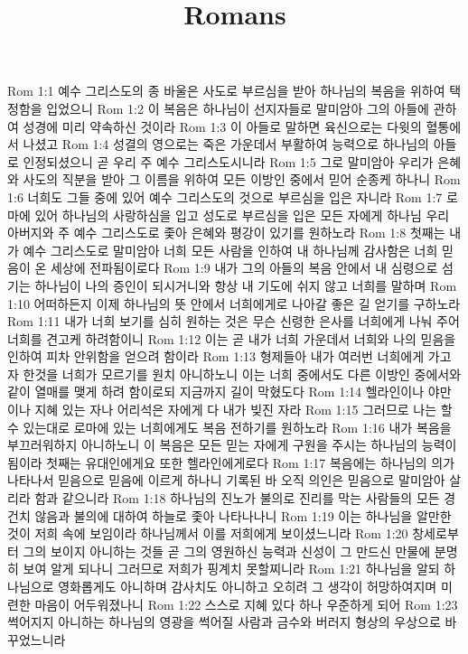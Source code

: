 

\title{Romans}

Rom 1:1  예수 그리스도의 종 바울은 사도로 부르심을 받아 하나님의 복음을 위하여 택정함을 입었으니
Rom 1:2  이 복음은 하나님이 선지자들로 말미암아 그의 아들에 관하여 성경에 미리 약속하신 것이라
Rom 1:3  이 아들로 말하면 육신으로는 다윗의 혈통에서 나셨고
Rom 1:4  성결의 영으로는 죽은 가운데서 부활하여 능력으로 하나님의 아들로 인정되셨으니 곧 우리 주 예수 그리스도시니라
Rom 1:5  그로 말미암아 우리가 은혜와 사도의 직분을 받아 그 이름을 위하여 모든 이방인 중에서 믿어 순종케 하나니
Rom 1:6  너희도 그들 중에 있어 예수 그리스도의 것으로 부르심을 입은 자니라
Rom 1:7  로마에 있어 하나님의 사랑하심을 입고 성도로 부르심을 입은 모든 자에게 하나님 우리 아버지와 주 예수 그리스도로 좇아 은혜와 평강이 있기를 원하노라
Rom 1:8  첫째는 내가 예수 그리스도로 말미암아 너희 모든 사람을 인하여 내 하나님께 감사함은 너희 믿음이 온 세상에 전파됨이로다
Rom 1:9  내가 그의 아들의 복음 안에서 내 심령으로 섬기는 하나님이 나의 증인이 되시거니와 항상 내 기도에 쉬지 않고 너희를 말하며
Rom 1:10  어떠하든지 이제 하나님의 뜻 안에서 너희에게로 나아갈 좋은 길 얻기를 구하노라
Rom 1:11  내가 너희 보기를 심히 원하는 것은 무슨 신령한 은사를 너희에게 나눠 주어 너희를 견고케 하려함이니
Rom 1:12  이는 곧 내가 너희 가운데서 너희와 나의 믿음을 인하여 피차 안위함을 얻으려 함이라
Rom 1:13  형제들아 내가 여러번 너희에게 가고자 한것을 너희가 모르기를 원치 아니하노니 이는 너희 중에서도 다른 이방인 중에서와 같이 열매를 맺게 하려 함이로되 지금까지 길이 막혔도다
Rom 1:14  헬라인이나 야만이나 지혜 있는 자나 어리석은 자에게 다 내가 빚진 자라
Rom 1:15  그러므로 나는 할 수 있는대로 로마에 있는 너희에게도 복음 전하기를 원하노라
Rom 1:16  내가 복음을 부끄러워하지 아니하노니 이 복음은 모든 믿는 자에게 구원을 주시는 하나님의 능력이 됨이라 첫째는 유대인에게요 또한 헬라인에게로다
Rom 1:17  복음에는 하나님의 의가 나타나서 믿음으로 믿음에 이르게 하나니 기록된 바 오직 의인은 믿음으로 말미암아 살리라 함과 같으니라
Rom 1:18  하나님의 진노가 불의로 진리를 막는 사람들의 모든 경건치 않음과 불의에 대하여 하늘로 좇아 나타나나니
Rom 1:19  이는 하나님을 알만한 것이 저희 속에 보임이라 하나님께서 이를 저희에게 보이셨느니라
Rom 1:20  창세로부터 그의 보이지 아니하는 것들 곧 그의 영원하신 능력과 신성이 그 만드신 만물에 분명히 보여 알게 되나니 그러므로 저희가 핑계치 못할찌니라
Rom 1:21  하나님을 알되 하나님으로 영화롭게도 아니하며 감사치도 아니하고 오히려 그 생각이 허망하여지며 미련한 마음이 어두워졌나니
Rom 1:22  스스로 지혜 있다 하나 우준하게 되어
Rom 1:23  썩어지지 아니하는 하나님의 영광을 썩어질 사람과 금수와 버러지 형상의 우상으로 바꾸었느니라
